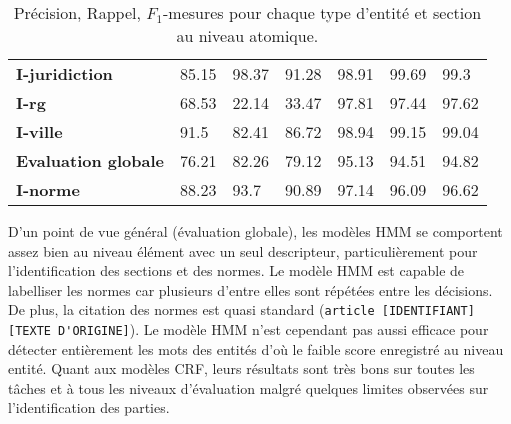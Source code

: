 \begin{table}[!ht]
\begin{tabular}{|l|l|l|l|l|l|l|}
		\textbf{I-juridiction} & 85.15              & 98.37           & 91.28       & 98.91              & 99.69           & 99.3        \\ 
		\textbf{I-rg}          & 68.53              & 22.14           & 33.47       & 97.81              & 97.44           & 97.62       \\ 
		\textbf{I-ville}       & 91.5               & 82.41           & 86.72       & 98.94              & 99.15           & 99.04       \\ \hline
		\textbf{Evaluation globale}       & 76.21              & 82.26           & 79.12       & 95.13              & 94.51           & 94.82       \\ \hline
		\noalign{\smallskip}\hline\noalign{\smallskip}
		\textbf{I-norme}       & 88.23              & 93.7            & 90.89       & 97.14              & 96.09           & 96.62       \\ \hline
	\end{tabular}
	\caption{Précision, Rappel, $F_1$-mesures pour chaque type d'entité et section au niveau atomique.}\label{tab:structuration:perf-detail-token}
\end{table}


D'un point de vue général (évaluation globale), les modèles HMM se comportent assez bien au niveau élément avec un seul descripteur, particulièrement pour l'identification des sections et des normes. Le modèle HMM est capable de labelliser les normes car plusieurs d'entre elles sont répétées entre les décisions. De plus, la citation des normes est quasi standard (\verb|article [IDENTIFIANT] [TEXTE D'ORIGINE]|). Le modèle HMM n'est cependant pas aussi efficace pour détecter entièrement les mots des entités d'où le faible score enregistré au niveau entité. Quant aux modèles CRF, leurs résultats sont très bons sur toutes les tâches et à tous les niveaux d'évaluation malgré quelques limites observées sur l'identification des parties.

